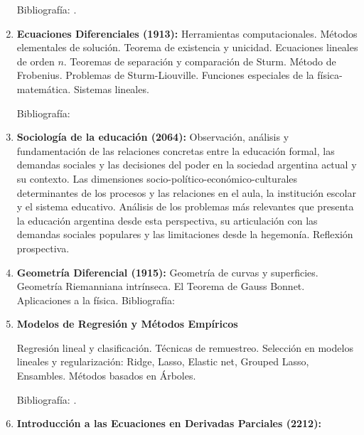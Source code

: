 \documentclass[a4paper, 12pt]{article}
\begin{document}
\begin{enumerate}
Bibliografía: \cite{favazo, loeve, EliasM.Stein105,TerenceTao123,A.N.Kolmogorov682,DavidM.Bressoud121,wheeden2015measure}.


\item\textbf{Ecuaciones Diferenciales (1913):} Herramientas computacionales. Métodos elementales de solución. Teorema de existencia y unicidad.  Ecuaciones lineales de orden $n$. Teoremas de separación y comparación de Sturm. Método de Frobenius.  Problemas de Sturm-Liouville. Funciones especiales de la física-matemática.  Sistemas lineales. 

Bibliografía: \cite{ GeorgeFinlaySimmons487,WilliamE.Boyce496, MorrisW.Hirsch540,JorgeSotomayor513,BarbaraD.MacCluer515,RichardS.Palais519,GarrettBirkhoff526}



\item\textbf{Sociología de la educación (2064):}  Observación, análisis y fundamentación de las relaciones concretas entre la educación formal, las demandas sociales y las decisiones del poder en la sociedad argentina actual y su contexto. Las dimensiones socio-político-económico-culturales determinantes de los procesos y las relaciones en el aula, la institución escolar y el sistema educativo. Análisis de los problemas más relevantes que presenta la educación argentina desde esta perspectiva, su articulación con las demandas sociales populares y las limitaciones desde la hegemonía. Reflexión prospectiva.  







\item\textbf{Geometría Diferencial (1915):} Geometría de curvas y superficies.
 Geometría Riemanniana
intrínseca. El Teorema de Gauss Bonnet. Aplicaciones a la física.
Bibliografía: \cite{aguirre07,barros21,barros19,costa05,docarmo95,hernandez10,lopez10,muñoz17,essley12,oneill}


\item\textbf{Modelos de Regresión y Métodos Empíricos}

Regresión lineal y clasificación. Técnicas de remuestreo. Selección en modelos lineales y regularización: Ridge, Lasso, Elastic net, Grouped Lasso, Ensambles.    Métodos basados en Árboles. 

Bibliografía: \cite{friedman, james, trevor, efron}.



\item\textbf{Introducción a las Ecuaciones en Derivadas Parciales (2212):}  



\end{enumerate}
\end{document}
